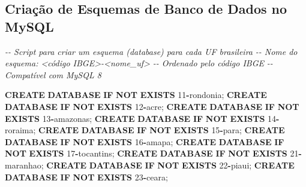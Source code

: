 \documentclass[
]{book}
\newenvironment{Shaded}{\begin{snugshade}}{\end{snugshade}}
\newcommand{\CommentTok}[1]{\textcolor[rgb]{0.56,0.35,0.01}{\textit{#1}}}
\newcommand{\ControlFlowTok}[1]{\textcolor[rgb]{0.13,0.29,0.53}{\textbf{#1}}}
\newcommand{\DecValTok}[1]{\textcolor[rgb]{0.00,0.00,0.81}{#1}}
\newcommand{\KeywordTok}[1]{\textcolor[rgb]{0.13,0.29,0.53}{\textbf{#1}}}
\newcommand{\NormalTok}[1]{#1}
\newcommand{\OperatorTok}[1]{\textcolor[rgb]{0.81,0.36,0.00}{\textbf{#1}}}
\begin{document}
\subsection{Criação de Esquemas de Banco de Dados no MySQL}\label{criauxe7uxe3o-de-esquemas-de-banco-de-dados-no-mysql}

\begin{Shaded}
\begin{Highlighting}[]
\CommentTok{{-}{-} Script para criar um esquema (database) para cada UF brasileira}
\CommentTok{{-}{-} Nome do esquema: \textless{}código IBGE\textgreater{}{-}\textless{}nome\_uf\textgreater{}}
\CommentTok{{-}{-} Ordenado pelo código IBGE}
\CommentTok{{-}{-} Compatível com MySQL 8}

\KeywordTok{CREATE} \KeywordTok{DATABASE} \ControlFlowTok{IF} \KeywordTok{NOT} \KeywordTok{EXISTS}\NormalTok{ \textasciigrave{}}\DecValTok{11}\OperatorTok{{-}}\NormalTok{rondonia\textasciigrave{};}
\KeywordTok{CREATE} \KeywordTok{DATABASE} \ControlFlowTok{IF} \KeywordTok{NOT} \KeywordTok{EXISTS}\NormalTok{ \textasciigrave{}}\DecValTok{12}\OperatorTok{{-}}\NormalTok{acre\textasciigrave{};}
\KeywordTok{CREATE} \KeywordTok{DATABASE} \ControlFlowTok{IF} \KeywordTok{NOT} \KeywordTok{EXISTS}\NormalTok{ \textasciigrave{}}\DecValTok{13}\OperatorTok{{-}}\NormalTok{amazonas\textasciigrave{};}
\KeywordTok{CREATE} \KeywordTok{DATABASE} \ControlFlowTok{IF} \KeywordTok{NOT} \KeywordTok{EXISTS}\NormalTok{ \textasciigrave{}}\DecValTok{14}\OperatorTok{{-}}\NormalTok{roraima\textasciigrave{};}
\KeywordTok{CREATE} \KeywordTok{DATABASE} \ControlFlowTok{IF} \KeywordTok{NOT} \KeywordTok{EXISTS}\NormalTok{ \textasciigrave{}}\DecValTok{15}\OperatorTok{{-}}\NormalTok{para\textasciigrave{};}
\KeywordTok{CREATE} \KeywordTok{DATABASE} \ControlFlowTok{IF} \KeywordTok{NOT} \KeywordTok{EXISTS}\NormalTok{ \textasciigrave{}}\DecValTok{16}\OperatorTok{{-}}\NormalTok{amapa\textasciigrave{};}
\KeywordTok{CREATE} \KeywordTok{DATABASE} \ControlFlowTok{IF} \KeywordTok{NOT} \KeywordTok{EXISTS}\NormalTok{ \textasciigrave{}}\DecValTok{17}\OperatorTok{{-}}\NormalTok{tocantins\textasciigrave{};}
\KeywordTok{CREATE} \KeywordTok{DATABASE} \ControlFlowTok{IF} \KeywordTok{NOT} \KeywordTok{EXISTS}\NormalTok{ \textasciigrave{}}\DecValTok{21}\OperatorTok{{-}}\NormalTok{maranhao\textasciigrave{};}
\KeywordTok{CREATE} \KeywordTok{DATABASE} \ControlFlowTok{IF} \KeywordTok{NOT} \KeywordTok{EXISTS}\NormalTok{ \textasciigrave{}}\DecValTok{22}\OperatorTok{{-}}\NormalTok{piaui\textasciigrave{};}
\KeywordTok{CREATE} \KeywordTok{DATABASE} \ControlFlowTok{IF} \KeywordTok{NOT} \KeywordTok{EXISTS}\NormalTok{ \textasciigrave{}}\DecValTok{23}\OperatorTok{{-}}\NormalTok{ceara\textasciigrave{};}

\end{Highlighting}
\end{Shaded}
\end{document}
